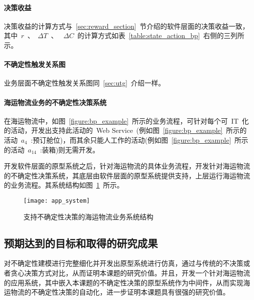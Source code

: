 \paragraph{决策收益}

决策收益的计算方式与~\ref{sec:reward_section}~节介绍的软件层面的决策收益一致，其中~$r$~、~$\Delta T$~、 ~$\Delta C$~的计算方式如表~\ref{table:state_action_bp}~右侧的三列所示。

\paragraph{不确定性触发关系图}

业务层面不确定性触发关系图同~\ref{sec:utg}~介绍一样。

\paragraph{海运物流业务的不确定性决策系统}

在海运物流中，如图~\ref{figure:bp_example}~所示的业务流程，可针对每个可~IT~化的活动，开发出支持此活动的~Web Service~(例如图~\ref{figure:bp_example}~所示的活动~$a_{4}$~:预订舱位)，而其余只能人工作的活动(例如图~\ref{figure:bp_example}~所示的活动~$a_{14}$~:装箱)则无需开发。

开发软件层面的原型系统之后，针对海运物流的具体业务流程，开发针对海运物流的不确定性决策系统，其底层由软件层面的原型系统提供支持，上层运行海运物流的业务流程。其系统结构如图~\ref{figure:app_system}~所示。

\begin{figure}[htbp]
    \centering
    \texttt{[image: app\_system]}
    \caption{支持不确定性决策的海运物流业务系统结构}\label{figure:app_system}
    \vspace{-1em}
\end{figure}


\subsection{预期达到的目标和取得的研究成果}

对不确定性建模进行完整细化并开发出原型系统进行仿真，通过与传统的不决策或者贪心决策方式对比，从而证明本课题的研究价值。并且，开发一个针对海运物流的应用系统，其中嵌入本课题的不确定性决策的原型系统作为中间件，从而实现海运物流的不确定性决策的自动化，进一步证明本课题具有很强的研究价值。

